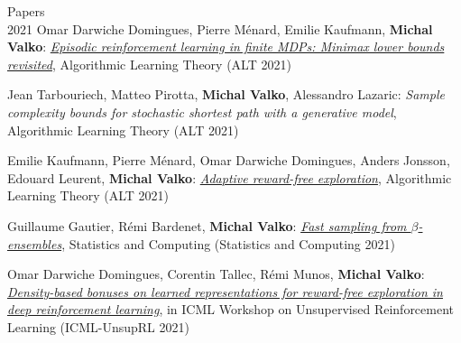 \documentclass{resume}
\begin{document}
\begin{category}{Papers\\2021}
\citembullet
Omar Darwiche Domingues, Pierre M\'enard,  Emilie Kaufmann, {\bf Michal Valko}:
\href{https://arxiv.org/pdf/2010.03531.pdf}
{\emph{Episodic reinforcement learning in finite MDPs: Minimax lower bounds revisited}},
Algorithmic Learning Theory
({\sf ALT 2021}) 

\citembullet
Jean Tarbouriech, Matteo Pirotta, {\bf Michal Valko}, Alessandro Lazaric:
{\emph{Sample complexity bounds for stochastic shortest path with a generative model}},
Algorithmic Learning Theory
({\sf ALT 2021}) 


\citembullet
Emilie Kaufmann, Pierre M\' enard, Omar Darwiche Domingues, Anders Jonsson, Edouard Leurent, {\bf Michal Valko}:
\href{http://arxiv.org/abs/2006.06294}{\emph{Adaptive reward-free exploration}},
Algorithmic Learning Theory
({\sf ALT 2021}) 

\citembullet
Guillaume Gautier, R\' emi Bardenet, {\bf Michal Valko}:
\href{https://arxiv.org/pdf/2003.02344.pdf}
{\emph{Fast sampling from $\beta$-ensembles}},
Statistics and Computing
({\sf Statistics and Computing 2021}) 


\citembullet
Omar Darwiche Domingues, Corentin Tallec, R\' emi Munos,  {\bf Michal Valko}: 
\href{https://openreview.net/pdf?id=vRSY3L4Rlhp}{\emph{Density-based bonuses on learned representations for reward-free exploration in deep reinforcement learning}}, in 
 ICML Workshop on Unsupervised Reinforcement Learning
({\sf ICML-UnsupRL 2021}) 
\end{category}
\end{document}

